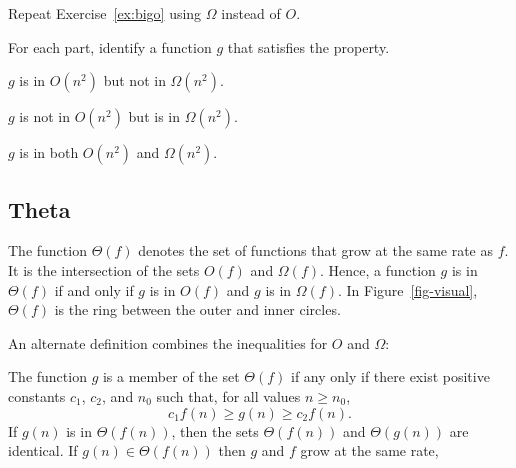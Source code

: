 \begin{schemeregion}
\beforeex
\begin{exercise}
Repeat Exercise~\ref{ex:bigo} using $\Omega$ instead of $O$.
\solution{\LATER{}}
\end{exercise}
\afterex

\beforeex
\begin{exercise}
For each part, identify a function $g$ that satisfies the property.
\begin{subexerciselist}
\item $g$ is in $O(n^2)$ but not in $\Omega(n^2)$.
\solution{\LATER{}}
\item $g$ is not in $O(n^2)$ but is in $\Omega(n^2)$.
\solution{\LATER{}}
\item $g$ is in both $O(n^2)$ and $\Omega(n^2)$.
\solution{\LATER{}}
\end{subexerciselist}
\end{exercise}
\afterex


\subsection{Theta}

The function $\Theta(f)$ denotes the set of functions that grow at the same rate as $f$.  It is the intersection of the sets $O(f)$ and $\Omega(f)$.  Hence, a function $g$ is in $\Theta(f)$ if and only if $g$ is in $O(f)$ and $g$ is in $\Omega(f)$.  In Figure~\ref{fig-visual}, $\Theta(f)$ is the ring between the outer and inner circles.

An alternate definition combines the inequalities for $O$ and $\Omega$:

 The function $g$ is a member of the set $\Theta(f)$ if any only if there exist positive constants $c_1$, $c_2$, and $n_0$ such that, for all values $n \ge n_0$, 
\begin{displaymath}
c_1 f(n) \ge g(n) \ge c_2 f(n).
\end{displaymath}
If $g(n)$ is in $\Theta(f(n))$, then the sets $\Theta(f(n))$ and $\Theta(g(n))$ are identical.   If $g(n) \in \Theta(f(n))$ then $g$ and $f$ grow at the same rate, 


\end{schemeregion}
